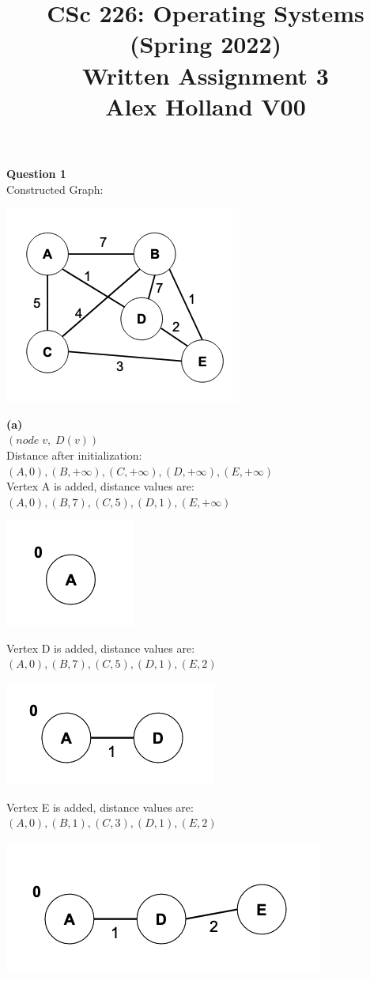 \documentclass{article}
\title{%
   CSc 226: Operating Systems (Spring 2022) \\
   \large Written Assignment 3\\
    Alex Holland V00}
\date{}
\begin{document}
\maketitle

{\bf Question 1}\\
Constructed Graph:

\begin{center}
    \includegraphics[width=.4\textwidth]{1.png}
\end{center}

{\bf (a)}\\
$(node \; v, \; D(v))$\\
Distance after initialization: $(A, 0), (B,+\infty), (C,+\infty), (D,+\infty), (E,+\infty)$\\


Vertex A is added, distance values are: $(A, 0), (B,7), (C,5), (D,1), (E,+\infty)$

\begin{center}
    \includegraphics[width=.2\textwidth]{1a-1.png}
\end{center}

Vertex D is added, distance values are: $(A, 0), (B,7), (C,5), (D,1), (E,2)$

\begin{center}
    \includegraphics[width=.3\textwidth]{1a-2.png}
\end{center}

Vertex E is added, distance values are: $(A, 0), (B,1), (C,3), (D,1), (E,2)$

\begin{center}
    \includegraphics[width=.4\textwidth]{1a-3.png}
\end{center}
\end{document}
